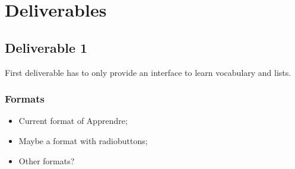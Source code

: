 \documentclass{report}
\begin{document}
\chapter{Deliverables}

\section{Deliverable 1}

First deliverable has to only provide an interface to learn vocabulary and lists.

\subsection{Formats}

\begin{itemize}
\item Current format of Apprendre;
\item Maybe a format with radiobuttons;
\item Other formats?
\end{itemize}
\end{document}
